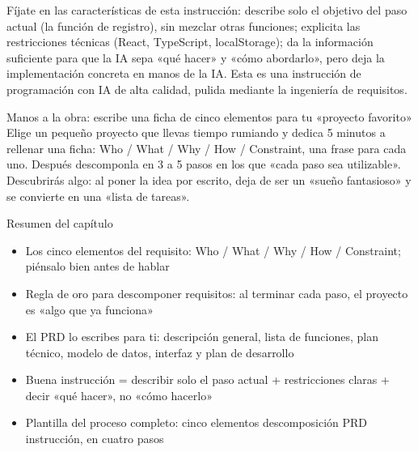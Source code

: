 Fíjate en las características de esta instrucción: describe solo el objetivo del paso actual (la función de registro), sin mezclar otras funciones; explicita las restricciones técnicas (React, TypeScript, localStorage); da la información suficiente para que la IA sepa «qué hacer» y «cómo abordarlo», pero deja la implementación concreta en manos de la IA. Esta es una instrucción de programación con IA de alta calidad, pulida mediante la ingeniería de requisitos.

\begin{tcbpractice}{Manos a la obra: escribe una ficha de cinco elementos para tu «proyecto favorito»}
Elige un pequeño proyecto que llevas tiempo rumiando y dedica 5 minutos a rellenar una ficha: Who / What / Why / How / Constraint, una frase para cada uno. Después descomponla en 3 a 5 pasos en los que «cada paso sea utilizable». Descubrirás algo: al poner la idea por escrito, deja de ser un «sueño fantasioso» y se convierte en una «lista de tareas».

\end{tcbpractice}

\begin{tcbsummary}{Resumen del capítulo}
\begin{itemize}
  \item Los cinco elementos del requisito: Who / What / Why / How / Constraint; piénsalo bien antes de hablar
  \item Regla de oro para descomponer requisitos: al terminar cada paso, el proyecto es «algo que ya funciona»
  \item El PRD lo escribes para ti: descripción general, lista de funciones, plan técnico, modelo de datos, interfaz y plan de desarrollo
  \item Buena instrucción = describir solo el paso actual + restricciones claras + decir «qué hacer», no «cómo hacerlo»
  \item Plantilla del proceso completo: cinco elementos descomposición PRD instrucción, en cuatro pasos
\end{itemize}

\end{tcbsummary}

